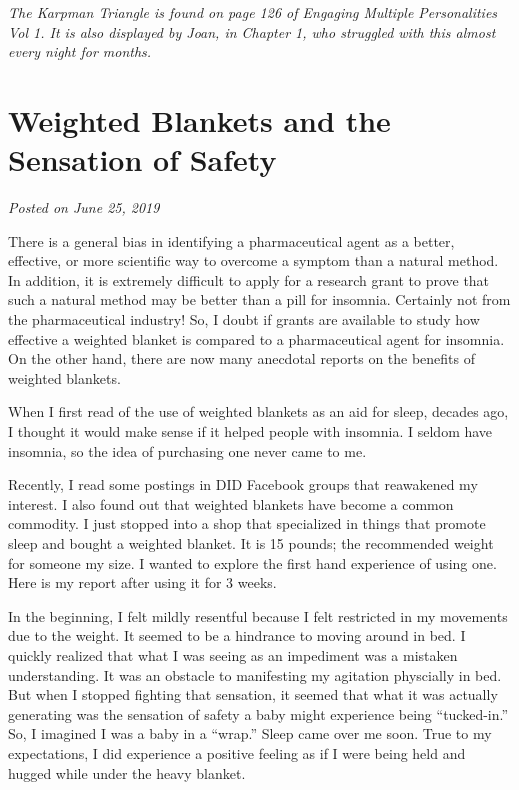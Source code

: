 \documentclass[]{book}
\begin{document}
\emph{The Karpman Triangle is found on page 126 of Engaging Multiple Personalities Vol 1. It is also displayed by Joan, in Chapter 1, who struggled with this almost every night for months.}

\hypertarget{weighted-blankets-and-the-sensation-of-safety}{%
\section{Weighted Blankets and the Sensation of Safety}\label{weighted-blankets-and-the-sensation-of-safety}}

\emph{Posted on June 25, 2019}

There is a general bias in identifying a pharmaceutical agent as a better, effective, or more scientific way to overcome a symptom than a natural method. In addition, it is extremely difficult to apply for a research grant to prove that such a natural method may be better than a pill for insomnia. Certainly not from the pharmaceutical industry! So, I doubt if grants are available to study how effective a weighted blanket is compared to a pharmaceutical agent for insomnia. On the other hand, there are now many anecdotal reports on the benefits of weighted blankets.

When I first read of the use of weighted blankets as an aid for sleep, decades ago, I thought it would make sense if it helped people with insomnia. I seldom have insomnia, so the idea of purchasing one never came to me.

Recently, I read some postings in DID Facebook groups that reawakened my interest. I also found out that weighted blankets have become a common commodity. I just stopped into a shop that specialized in things that promote sleep and bought a weighted blanket. It is 15 pounds; the recommended weight for someone my size. I wanted to explore the first hand experience of using one. Here is my report after using it for 3 weeks.

In the beginning, I felt mildly resentful because I felt restricted in my movements due to the weight. It seemed to be a hindrance to moving around in bed. I quickly realized that what I was seeing as an impediment was a mistaken understanding. It was an obstacle to manifesting my agitation physcially in bed. But when I stopped fighting that sensation, it seemed that what it was actually generating was the sensation of safety a baby might experience being ``tucked-in.'' So, I imagined I was a baby in a ``wrap.'' Sleep came over me soon. True to my expectations, I did experience a positive feeling as if I were being held and hugged while under the heavy blanket.
\end{document}
